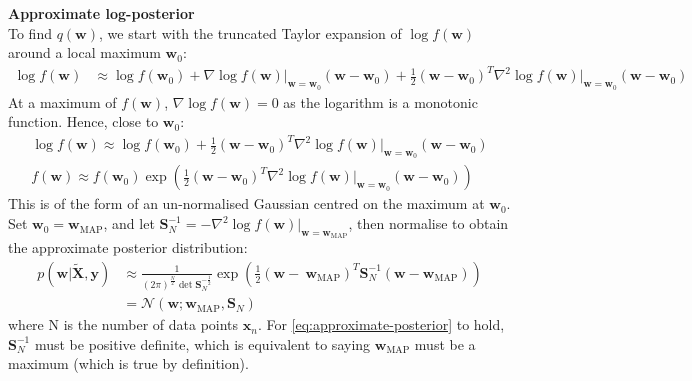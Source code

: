 \documentclass[a4paper]{article}
\begin{document}
    \vspace{\baselineskip}
    \noindent\textbf{Approximate log-posterior} \\
    \noindent To find $q(\bm{w})$, we start with the truncated Taylor expansion of $\log f(\bm{w})$ around a local maximum $\bm{w}_0$:
    \begin{align}
        \nonumber
        \log f(\bm{w}) &\approx \log f(\bm{w}_0) + \nabla \log f(\bm{w}) \big|_{\bm{w} = \bm{w}_0} (\bm{w} - \bm{w}_0)
        + \frac{1}{2} (\bm{w} - \bm{w}_0)^T \nabla^2 \log f(\bm{w}) \big|_{\bm{w} = \bm{w}_0} (\bm{w} - \bm{w}_0)
    \end{align}
    At a maximum of $f(\bm{w})$, $\nabla \log f(\bm{w}) = 0$ as the logarithm is a monotonic function.
    Hence, close to $\bm{w}_0$:
    \begin{align}
        \log f(\bm{w}) \approx \log f(\bm{w}_0) + \frac{1}{2} (\bm{w} - \bm{w}_0)^T \nabla^2 \log f(\bm{w}) \big|_{\bm{w} = \bm{w}_0} (\bm{w} - \bm{w}_0) \nonumber \\
        f(\bm{w}) \approx f(\bm{w}_0) \exp \left(\frac{1}{2} (\bm{w} - \bm{w}_0)^T \nabla^2 \log f(\bm{w}) \big|_{\bm{w} = \bm{w}_0} (\bm{w} - \bm{w}_0) \right) \nonumber
    \end{align}
   This is of the form of an un-normalised Gaussian centred on the maximum at $\bm{w}_0$.
    Set $\bm{w}_0 = \bm{w}_\text{MAP}$, and let $\bm{S}_N^{-1} = -\nabla^2 \log f(\bm{w})\big|_{\bm{w} = \bm{w}_\text{MAP}}$,
    then normalise to obtain the approximate posterior distribution:
    \begin{align}
        p(\bm{w} | \tilde{\bm{X}}, \bm{y}) &\approx \frac{1}{(2\pi)^\frac{N}{2} \det\bm{S}_N^{-\frac{1}{2}}} \exp \left(\frac{1}{2} (\bm{w} - \ \bm{w}_\text{MAP})^T \bm{S}_N^{-1} (\bm{w} -  \bm{w}_\text{MAP}) \right) \nonumber \\
        &= \mathcal{N}(\bm{w};  \bm{w}_\text{MAP}, \bm{S}_N)
        \label{eq:approximate-posterior}
    \end{align}
    where N is the number of data points $\bm{x}_n$.
    For \autoref{eq:approximate-posterior} to hold, $\bm{S}_N^{-1}$ must be positive definite, which is equivalent to saying $\bm{w}_\text{MAP}$ must be a maximum (which is true by definition).
\end{document}
